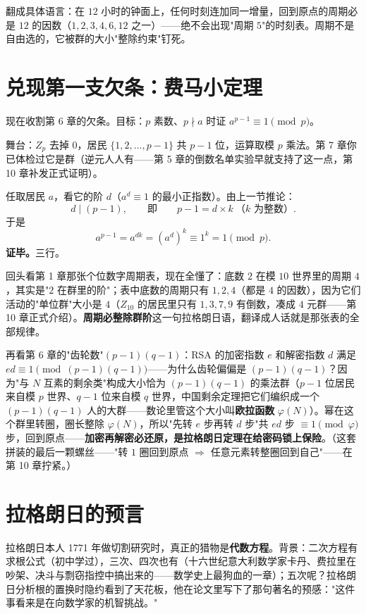 翻成具体语言：在 $12$ 小时的钟面上，任何时刻连加同一增量，回到原点的周期必是 $12$ 的因数（$1, 2, 3, 4, 6, 12$ 之一）——绝不会出现"周期 $5$"的时刻表。周期不是自由选的，它被群的大小"整除约束"钉死。

\section{兑现第一支欠条：费马小定理}

现在收割第 6 章的欠条。目标：$p$ 素数、$p\nmid a$ 时证 $a^{p-1}\equiv1\pmod p$。

舞台：$Z_p$ 去掉 $0$，居民 $\{1, 2, \dots, p-1\}$ 共 $p-1$ 位，运算取模 $p$ 乘法。第 7 章你已体检过它是群（逆元人人有——第 5 章的倒数名单实验早就支持了这一点，第 10 章补发正式证明）。

任取居民 $a$，看它的阶 $d$（$a^d \equiv 1$ 的最小正指数）。由上一节推论：
\[
d \mid (p-1), \qquad\text{即}\qquad p - 1 = d\times k \ \text{（}k\text{ 为整数）}.
\]
于是
\[
a^{p-1} = a^{dk} = \left(a^{d}\right)^{k} \equiv 1^{k} = 1 \pmod p .
\]
\textbf{证毕。}三行。

回头看第 1 章那张个位数字周期表，现在全懂了：底数 $2$ 在模 $10$ 世界里的周期 $4$，其实是"$2$ 在群里的阶"；表中底数的周期只有 $1, 2, 4$（都是 $4$ 的因数），因为它们活动的"单位群"大小是 $4$（$Z_{10}$ 的居民里只有 $1,3,7,9$ 有倒数，凑成 $4$ 元群——第 10 章正式介绍）。\textbf{周期必整除群阶}这一句拉格朗日语，翻译成人话就是那张表的全部规律。

再看第 6 章的"齿轮数"$(p-1)(q-1)$：RSA 的加密指数 $e$ 和解密指数 $d$ 满足 $ed \equiv 1 \pmod{(p-1)(q-1)}$——为什么齿轮偏偏是 $(p-1)(q-1)$？因为"与 $N$ 互素的剩余类"构成大小恰为 $(p-1)(q-1)$ 的乘法群（$p-1$ 位居民来自模 $p$ 世界、$q-1$ 位来自模 $q$ 世界，中国剩余定理把它们编织成一个 $(p-1)(q-1)$ 人的大群——数论里管这个大小叫\textbf{欧拉函数} $\varphi(N)$）。幂在这个群里转圈，圈长整除 $\varphi(N)$，所以"先转 $e$ 步再转 $d$ 步"共 $ed$ 步 $\equiv 1 \pmod{\varphi}$ 步，回到原点——\textbf{加密再解密必还原，是拉格朗日定理在给密码锁上保险}。（这套拼装的最后一颗螺丝——"转 $1$ 圈回到原点 $\Rightarrow$ 任意元素转整圈回到自己"——在第 10 章拧紧。）

\section{拉格朗日的预言}

拉格朗日本人 1771 年做切割研究时，真正的猎物是\textbf{代数方程}。背景：二次方程有求根公式（初中学过），三次、四次也有（十六世纪意大利数学家卡丹、费拉里在吵架、决斗与剽窃指控中搞出来的——数学史上最狗血的一章）；五次呢？拉格朗日分析根的置换时隐约看到了天花板，他在论文里写下了那句著名的预感："这件事看来是在向数学家的机智挑战。"

